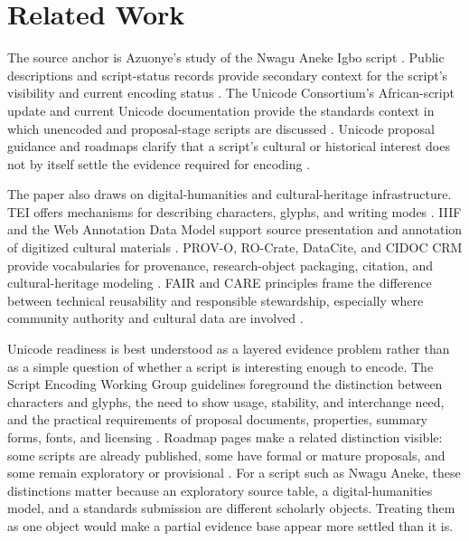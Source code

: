 \documentclass[sigconf,nonacm]{acmart}
\begin{document}
\section{Related Work}
The source anchor is Azuonye's study of the Nwagu Aneke Igbo script
\cite{azuonye1992}. Public descriptions and script-status records provide
secondary context for the script's visibility and current encoding status
\cite{omniglotNwagu,scriptSourceNwagu,sirisNwaguProposal}. The Unicode
Consortium's African-script update and current Unicode documentation provide
the standards context in which unencoded and proposal-stage scripts are
discussed \cite{unicodeAfricanScripts2023,unicode17CoreSpec}. Unicode proposal
guidance and roadmaps clarify that a script's cultural or historical interest
does not by itself settle the evidence required for encoding
\cite{unicodeProposals,unicodeRoadmaps,unicodePipeline2026,seiProposalTips}.

The paper also draws on digital-humanities and cultural-heritage infrastructure.
TEI offers mechanisms for describing characters, glyphs, and writing modes
\cite{teiP5Glyphs}. IIIF and the Web Annotation Data Model support source
presentation and annotation of digitized cultural materials
\cite{iiifPresentation3,w3cAnnotationModel,w3cAnnotationVocab}. PROV-O,
RO-Crate, DataCite, and CIDOC CRM provide vocabularies for provenance,
research-object packaging, citation, and cultural-heritage modeling
\cite{w3cProvO,rocrate12,datacite45,cidocCrm}. FAIR and CARE principles frame
the difference between technical reusability and responsible stewardship,
especially where community authority and cultural data are involved
\cite{wilkinson2016fair,carroll2020care}.

Unicode readiness is best understood as a layered evidence problem rather than
as a simple question of whether a script is interesting enough to encode. The
Script Encoding Working Group guidelines foreground the distinction between
characters and glyphs, the need to show usage, stability, and interchange need,
and the practical requirements of proposal documents, properties, summary
forms, fonts, and licensing \cite{unicodeProposals}. Roadmap pages make a
related distinction visible: some scripts are already published, some have
formal or mature proposals, and some remain exploratory or provisional
\cite{unicodeRoadmaps}. For a script such as Nwagu Aneke, these distinctions
matter because an exploratory source table, a digital-humanities model, and a
standards submission are different scholarly objects. Treating them as one
object would make a partial evidence base appear more settled than it is.
\end{document}

